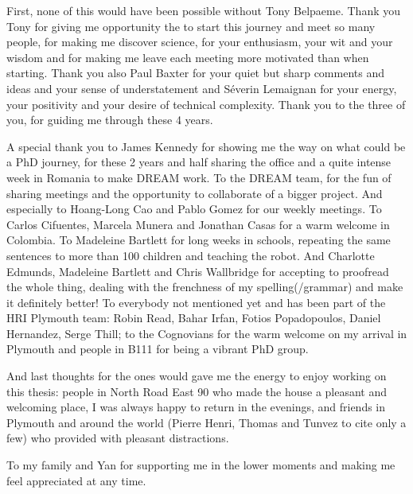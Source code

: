 First, none of this would have been possible without Tony Belpaeme. Thank you Tony for giving me opportunity the to start this journey and meet so many people, for making me discover science, for your enthusiasm, your wit and your wisdom and for making me leave each meeting more motivated than when starting. Thank you also Paul Baxter for your quiet but sharp comments and ideas and your sense of understatement and S\'{e}verin Lemaignan for your energy, your positivity and your desire of technical complexity. Thank you to the three of you, for guiding me through these 4 years.

A special thank you to James Kennedy for showing me the way on what could be a PhD journey, for these 2 years and half sharing the office and a quite intense week in Romania to make DREAM work. To the DREAM team, for the fun of sharing meetings and the opportunity to collaborate of a bigger project. And especially to Hoang-Long Cao and Pablo Gomez for our weekly meetings. To Carlos Cifuentes, Marcela Munera and Jonathan Casas for a warm welcome in Colombia. To Madeleine Bartlett for long weeks in schools, repeating the same sentences to more than 100 children and teaching the robot. And Charlotte Edmunds, Madeleine Bartlett and Chris Wallbridge for accepting to proofread the whole thing, dealing with the frenchness of my spelling(/grammar) and make it definitely better! To everybody not mentioned yet and has been part of the HRI Plymouth team: Robin Read, Bahar Irfan, Fotios Popadopoulos, Daniel Hernandez, Serge Thill; to the Cognovians for the warm welcome on my arrival in Plymouth and people in B111 for being a vibrant PhD group.

And last thoughts for the ones would gave me the energy to enjoy working on this thesis: people in North Road East 90 who made the house a pleasant and welcoming place, I was always happy to return in the evenings, and friends in Plymouth and around the world (Pierre Henri, Thomas and Tunvez to cite only a few) who provided with pleasant distractions.

To my family and Yan for supporting me in the lower moments and making me feel appreciated at any time.